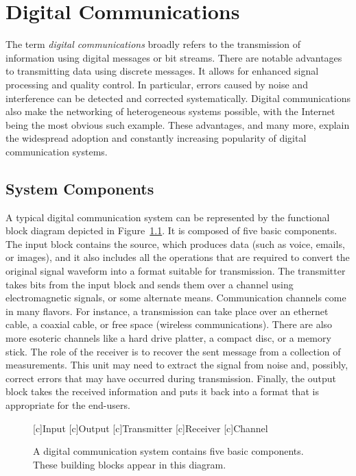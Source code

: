 \chapter{Digital Communications}
\label{chapter:DigitalComm}

The term \emph{digital communications} broadly refers to the transmission of information using digital messages or bit streams.
There are notable advantages to transmitting data  using discrete messages.
It allows for enhanced signal processing and quality control.
In particular, errors caused by noise and interference can be detected and corrected systematically.
Digital communications also make the networking of heterogeneous systems possible, with the Internet being the most obvious such example.
These advantages, and many more, explain the widespread adoption and constantly increasing popularity of digital communication systems.


\section{System Components}

A typical digital communication system can be represented by the functional block diagram depicted in Figure~\ref{figure:BlockDiagram}.
It is composed of five basic components.
The input block contains the source, which produces data (such as voice, emails, or images), and it also includes all the operations that are required to convert the original signal waveform into a format suitable for transmission.
The transmitter takes bits from the input block and sends them over a channel using electromagnetic signals, or some alternate means.
Communication channels come in many flavors.
For instance, a transmission can take place over an ethernet cable, a coaxial cable, or free space (wireless communications).
There are also more esoteric channels like a hard drive platter, a compact disc, or a memory stick.
The role of the receiver is to recover the sent message from a collection of measurements.
This unit may need to extract the signal from noise and, possibly, correct errors that may have occurred during transmission.
Finally, the output block takes the received information and puts it back into a format that is appropriate for the end-users.

\begin{figure}[htbp]
\begin{center}
\begin{psfrags}
[c]{Input}
[c]{Output}
[c]{Transmitter}
[c]{Receiver}
[c]{Channel}
\end{psfrags}
\end{center}
\caption{A digital communication system contains five basic components.
These building blocks appear in this diagram.}
\label{figure:BlockDiagram}
\end{figure}

